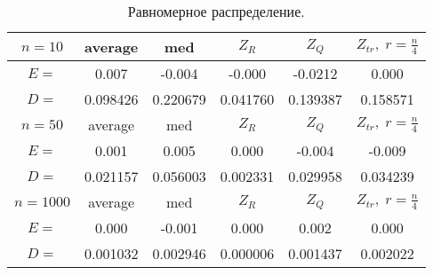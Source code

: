 \documentclass[a4]{article}
\begin{document}
		\begin{table}[h]
			\caption{ Равномерное распределение.}
			\begin{center}
				\begin{tabular}{|c|c|c|c|c|c|}
					\hline
					$n = 10$  & average & med & $Z_R$ & $Z_Q$ & $Z_{tr},\;r=\frac{n}{4}$\\ \hline
					$E =$       &	0.007  &       -0.004 &       -0.000       & -0.0212      &  0.000\\ \hline  
					$D =$       &	0.098426     &    0.220679 &        0.041760      &   0.139387       &  0.158571  \\ \hline
					
					$n = 50$  & average & med & $Z_R$ & $Z_Q$ & $Z_{tr},\;r=\frac{n}{4}$\\ \hline
					$E =$       & 0.001 &        0.005      &   0.000     &    -0.004 &       -0.009    \\ \hline
					$D =$       &	0.021157      &   0.056003  &       0.002331      &   0.029958       &  0.034239\\ \hline
					
					$n = 1000$  & average & med & $Z_R$ & $Z_Q$ & $Z_{tr},\;r=\frac{n}{4}$\\ \hline
					$E =$     &  	0.000    &     -0.001 &        0.000       &  0.002       &  0.000\\ \hline
					$D =$    &   	0.001032      &   0.002946    &     0.000006      &   0.001437       &  0.002022  \\
					\hline
				\end{tabular}
			\end{center}
		\end{table}
		
\end{document}
